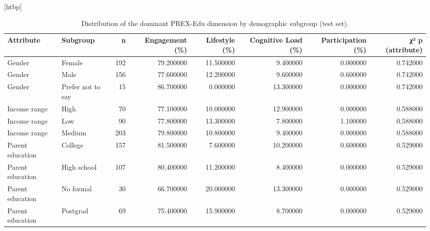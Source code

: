 \begin{table}
\small[htbp]
\caption{Distribution of the dominant PREX-Edu dimension by demographic subgroup (test set).}
\label{tab:S10_prex_by_subgroup}
\begin{tabular}{llrrrrrr}
\toprule
Attribute & Subgroup & n & Engagement (\%) & Lifestyle (\%) & Cognitive Load (\%) & Participation (\%) & χ² p (attribute) \\
\midrule
Gender & Female & 192 & 79.200000 & 11.500000 & 9.400000 & 0.000000 & 0.742000 \\
Gender & Male & 156 & 77.600000 & 12.200000 & 9.600000 & 0.600000 & 0.742000 \\
Gender & Prefer not to say & 15 & 86.700000 & 0.000000 & 13.300000 & 0.000000 & 0.742000 \\
Income range & High & 70 & 77.100000 & 10.000000 & 12.900000 & 0.000000 & 0.588000 \\
Income range & Low & 90 & 77.800000 & 13.300000 & 7.800000 & 1.100000 & 0.588000 \\
Income range & Medium & 203 & 79.800000 & 10.800000 & 9.400000 & 0.000000 & 0.588000 \\
Parent education & College & 157 & 81.500000 & 7.600000 & 10.200000 & 0.600000 & 0.529000 \\
Parent education & High school & 107 & 80.400000 & 11.200000 & 8.400000 & 0.000000 & 0.529000 \\
Parent education & No formal & 30 & 66.700000 & 20.000000 & 13.300000 & 0.000000 & 0.529000 \\
Parent education & Postgrad & 69 & 75.400000 & 15.900000 & 8.700000 & 0.000000 & 0.529000 \\
\bottomrule
\end{tabular}
\end{table}
